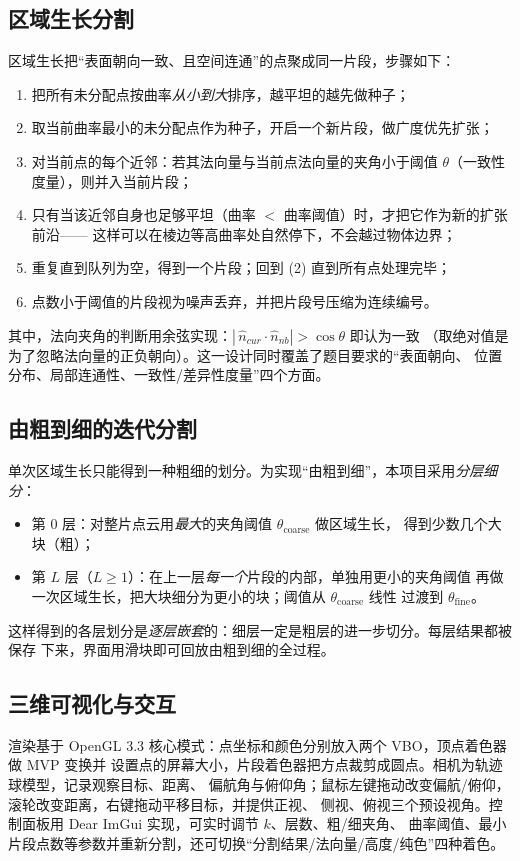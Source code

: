 \subsection{区域生长分割}
区域生长把“表面朝向一致、且空间连通”的点聚成同一片段\cite{rabbani2006}，步骤如下：

\begin{enumerate}[label=(\arabic*)]
  \item 把所有未分配点按曲率\emph{从小到大}排序，越平坦的越先做种子；
  \item 取当前曲率最小的未分配点作为种子，开启一个新片段，做广度优先扩张；
  \item 对当前点的每个近邻：若其法向量与当前点法向量的夹角小于阈值
        $\theta$（一致性度量），则并入当前片段；
  \item 只有当该近邻自身也足够平坦（曲率 $<$ 曲率阈值）时，才把它作为新的扩张前沿——
        这样可以在棱边等高曲率处自然停下，不会越过物体边界；
  \item 重复直到队列为空，得到一个片段；回到 (2) 直到所有点处理完毕；
  \item 点数小于阈值的片段视为噪声丢弃，并把片段号压缩为连续编号。
\end{enumerate}

其中，法向夹角的判断用余弦实现：$|\,\hat n_{cur}\cdot\hat n_{nb}|>\cos\theta$ 即认为一致
（取绝对值是为了忽略法向量的正负朝向）。这一设计同时覆盖了题目要求的“表面朝向、
位置分布、局部连通性、一致性/差异性度量”四个方面。

\subsection{由粗到细的迭代分割}
单次区域生长只能得到一种粗细的划分。为实现“由粗到细”，本项目采用\emph{分层细分}：

\begin{itemize}
  \item 第 0 层：对整片点云用\emph{最大}的夹角阈值 $\theta_{\text{coarse}}$ 做区域生长，
        得到少数几个大块（粗）；
  \item 第 $L$ 层（$L\ge1$）：在上一层\emph{每一个}片段的内部，单独用更小的夹角阈值
        再做一次区域生长，把大块细分为更小的块；阈值从 $\theta_{\text{coarse}}$ 线性
        过渡到 $\theta_{\text{fine}}$。
\end{itemize}

这样得到的各层划分是\emph{逐层嵌套}的：细层一定是粗层的进一步切分。每层结果都被保存
下来，界面用滑块即可回放由粗到细的全过程。

\subsection{三维可视化与交互}
渲染基于 OpenGL 3.3 核心模式：点坐标和颜色分别放入两个 VBO，顶点着色器做 MVP 变换并
设置点的屏幕大小，片段着色器把方点裁剪成圆点。相机为轨迹球模型，记录观察目标、距离、
偏航角与俯仰角；鼠标左键拖动改变偏航/俯仰，滚轮改变距离，右键拖动平移目标，并提供正视、
侧视、俯视三个预设视角。控制面板用 Dear ImGui 实现，可实时调节 $k$、层数、粗/细夹角、
曲率阈值、最小片段点数等参数并重新分割，还可切换“分割结果/法向量/高度/纯色”四种着色。

